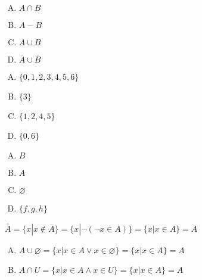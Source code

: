 {{        %
        \begin{practices}
            \begin{enumerate}[A.]
                \item $A \cap B$
                \item $A - B$
                \item $A \cup B$
                \item $\overline{A} \cup \overline{B}$
            \end{enumerate}
        \end{practices}

        \begin{practices}
            \begin{enumerate}[A.]
                \item $\{0, 1, 2, 3, 4, 5, 6\}$
                \item $\{3\}$
                \item $\{1, 2, 4, 5\}$
                \item $\{0, 6\}$
            \end{enumerate}
        \end{practices}

        \begin{practices}
            \begin{enumerate}[A.]
                \item $B$
                \item $A$
                \item $\varnothing$
                \item $\{f, g, h\}$
            \end{enumerate}
        \end{practices}

        \begin{practices}
            $\overline{\overline{A}} = \{x | x \notin \overline{A}\} = \{x | \neg (\neg x \in A)\} = \{x | x \in A\} = A$
        \end{practices}

        \begin{practices}
            \begin{enumerate}[A.]
                \item $A \cup \varnothing = \{x | x \in A \vee x \in \varnothing\} = \{x | x \in A\} = A$
                \item $A \cap U = \{x | x \in A \wedge x \in U\} = \{x | x \in A\} = A$
            \end{enumerate}
        \end{practices}

}}
